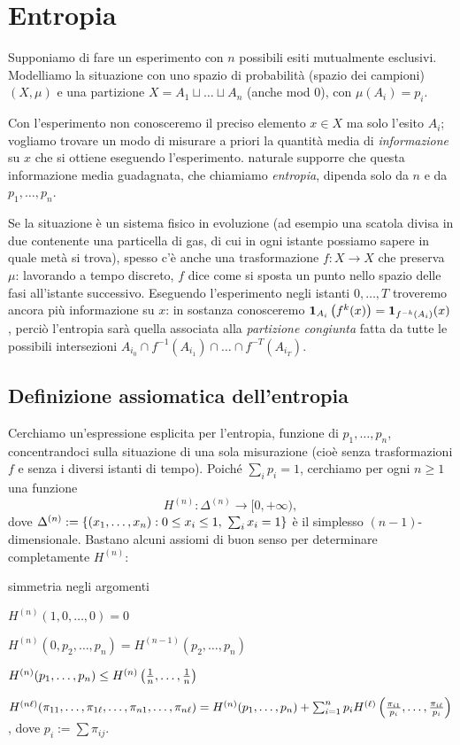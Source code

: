 \section{Entropia}

Supponiamo di fare un esperimento con $n$ possibili esiti mutualmente esclusivi.
Modelliamo la situazione con uno spazio di probabilità (spazio dei campioni) $(X,\mu)$
e una partizione $X=A_1\sqcup \dots\sqcup A_n$ (anche mod $0$), con $\mu(A_i)=p_i$. 

Con l'esperimento non conosceremo il preciso elemento $x\in X$ ma solo l'esito $A_i$; vogliamo
trovare un modo di misurare a priori la quantità media di \emph{informazione} su $x$ che si ottiene eseguendo l'esperimento. 
\Eacc naturale supporre che questa informazione media guadagnata, che chiamiamo \emph{entropia}, dipenda solo da $n$ e da $p_1,\dots,p_n$.

Se la situazione è un sistema fisico in evoluzione (ad esempio una scatola divisa in due contenente una particella di gas, di cui
in ogni istante possiamo sapere in quale metà si trova), spesso c'è anche una trasformazione $f:X\to X$
che preserva $\mu$: lavorando a tempo discreto, $f$ dice come si sposta un punto nello spazio delle fasi
all'istante successivo. Eseguendo l'esperimento negli istanti $0,\dots,T$ troveremo ancora più informazione su $x$:
in sostanza conosceremo $\bm{1}_{A_i}\left(f^k(x)\right)=\bm{1}_{f^{-k}(A_i)}(x)$, perciò l'entropia sarà quella associata
alla \emph{partizione congiunta} fatta da tutte le possibili intersezioni $A_{i_0}\cap f^{-1}(A_{i_1})\cap \dots\cap f^{-T}(A_{i_T})$.

\subsection{Definizione assiomatica dell'entropia}
Cerchiamo un'espressione esplicita per l'entropia, funzione di $p_1,\dots,p_n$, concentrandoci sulla situazione di una sola misurazione
(cioè senza trasformazioni $f$ e senza i diversi istanti di tempo).
Poiché $\sum_i p_i=1$, cerchiamo per ogni $n\ge 1$ una funzione
\[ H^{(n)}:\Delta^{(n)}\to [0,+\infty), \]
dove $\Delta^{(n)}:=\left\{(x_1,\dots,x_n):0\le x_i\le 1,\ \sum_i x_i=1\right\}$ è il simplesso $(n-1)$-dimensionale. Bastano alcuni assiomi di buon senso per determinare completamente $H^{(n)}$:
\begin{lista}
\item simmetria negli argomenti
\item $H^{(n)}(1,0,\dots,0)=0$
\item $H^{(n)}(0,p_2,\dots,p_n)=H^{(n-1)}(p_2,\dots,p_n)$
\item $H^{(n)}(p_1,\dots,p_n)\le H^{(n)}\left(\frac{1}{n},\dots,\frac{1}{n}\right)$
\item $H^{(n\ell)}(\pi_{11},\dots,\pi_{1\ell},\dots,\pi_{n1},\dots,\pi_{n\ell})=H^{(n)}(p_1,\dots,p_n)
+\sum_{i=1}^n p_i H^{(\ell)}\left(\frac{\pi_{i1}}{p_i},\dots,\frac{\pi_{i\ell}}{p_i}\right)$, dove $p_i:=\sum \pi_{ij}$.
\end{lista}

